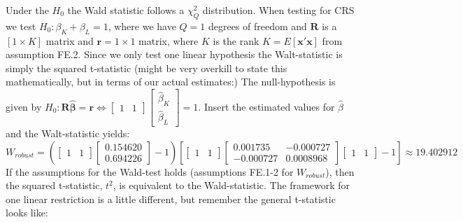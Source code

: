 Under the $H_0$ the Wald statistic follows a $\chi^2_Q$ distribution. When testing for CRS we test $H_0:\beta_K+\beta_L=1$, where we have $Q=1$ degrees of freedom and  $\mathbf{R}$ is a $[1 \times K]$ matrix and $\textbf{r}=1 \times 1$ matrix, where $K$ is the rank $K=E[\textbf{x}'\textbf{x}]$  from assumption FE.2. Since we only test one linear hypothesis the Walt-statistic is simply the squared t-statistic (might be very overkill to state this mathematically, but in terms of our actual estimates:)
The null-hypothesis is given by  $H_0: \mathbf{R}\boldsymbol{\hat{\beta}}=\mathbf{r}\Leftrightarrow \begin{bmatrix}1&1 \end{bmatrix} \begin{bmatrix}\hat{\beta}_K\\ \hat{\beta}_L \end{bmatrix}=1$. Insert the estimated values for $\hat{\beta}$ and the Walt-statistic yields:
\begin{equation*}
    W_{robust}= (\begin{bmatrix}1&1 \end{bmatrix} 
    \begin{bmatrix} 0.154620 \\ 0.694226 \end{bmatrix}-1)[\begin{bmatrix}1&1 \end{bmatrix}
    \begin{bmatrix}
        0.001735 & -0.000727 \\ 
        -0.000727 & 0.0008968
    \end{bmatrix} \begin{bmatrix}1&1 \end{bmatrix}-1]\approx 19.402912
\end{equation*}
If the assumptions for the Wald-test holds (assumptions FE.1-2 for $W_{robust}$), then the squared t-statistic, $t^2$, is equivalent to the Wald-statistic. The framework for one linear restriction is a little different, but remember the general t-statistic looks like:

